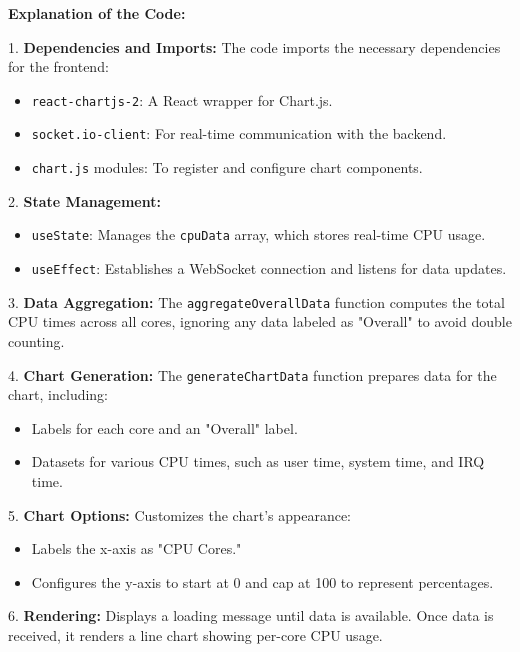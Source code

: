 \documentclass[12pt]{article}
\begin{document}
\textbf{Explanation of the Code:}

1. \textbf{Dependencies and Imports:}
   The code imports the necessary dependencies for the frontend:
   \begin{itemize}
       \item \texttt{react-chartjs-2}: A React wrapper for Chart.js.
       \item \texttt{socket.io-client}: For real-time communication with the backend.
       \item \texttt{chart.js} modules: To register and configure chart components.
   \end{itemize}

2. \textbf{State Management:}
   \begin{itemize}
       \item \texttt{useState}: Manages the \texttt{cpuData} array, which stores real-time CPU usage.
       \item \texttt{useEffect}: Establishes a WebSocket connection and listens for data updates.
   \end{itemize}

3. \textbf{Data Aggregation:}
   The \texttt{aggregateOverallData} function computes the total CPU times across all cores, ignoring any data labeled as "Overall" to avoid double counting.

4. \textbf{Chart Generation:}
   The \texttt{generateChartData} function prepares data for the chart, including:
   \begin{itemize}
       \item Labels for each core and an "Overall" label.
       \item Datasets for various CPU times, such as user time, system time, and IRQ time.
   \end{itemize}

5. \textbf{Chart Options:}
   Customizes the chart's appearance:
   \begin{itemize}
       \item Labels the x-axis as "CPU Cores."
       \item Configures the y-axis to start at 0 and cap at 100 to represent percentages.
   \end{itemize}

6. \textbf{Rendering:}
   Displays a loading message until data is available. Once data is received, it renders a line chart showing per-core CPU usage.
\end{document}
